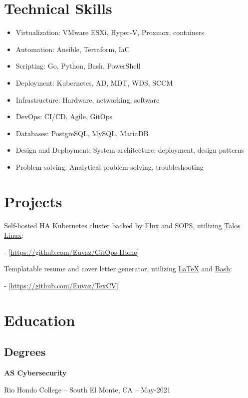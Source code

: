 \documentclass[a4paper]{article}
\begin{document}
\section{Technical Skills}
\begin{minipage}{\textwidth}
\begin{itemize}
    \item Virtualization: VMware ESXi, Hyper-V, Proxmox, containers
    \item Automation: Ansible, Terraform, IaC
    \item Scripting: Go, Python, Bash, PowerShell
    \item Deployment: Kubernetes, AD, MDT, WDS, SCCM
    \item Infrastructure: Hardware, networking, software
    \item DevOps: CI/CD, Agile, GitOps
    \item Databases: PostgreSQL, MySQL, MariaDB
    \item Design and Deployment: System architecture, deployment, design patterns
    \item Problem-solving: Analytical problem-solving, troubleshooting
\end{itemize}
\end{minipage}

\section{Projects}
Self-hosted HA Kubernetes cluster backed by \href{https://toolkit.fluxcd.io}{Flux} and \href{https://toolkit.fluxcd.io/guides/mozilla-sops}{SOPS}, utilizing \href{https://www.talos.dev/}{Talos Linux}:\par
- [\url{https://github.com/Euvaz/GitOps-Home}]

\medskip
Templatable resume and cover letter generator, utilizing \href{https://www.latex-project.org/}{LaTeX} and \href{https://www.gnu.org/software/bash/}{Bash}:\par
- [\url{https://github.com/Euvaz/TexCV}]

\section{Education}
\subsection{Degrees}
\begin{minipage}{\textwidth}
\textbf{AS Cybersecurity}\par
Rio Hondo College -- South El Monte, CA -- May-2021
\end{minipage}
\end{document}
